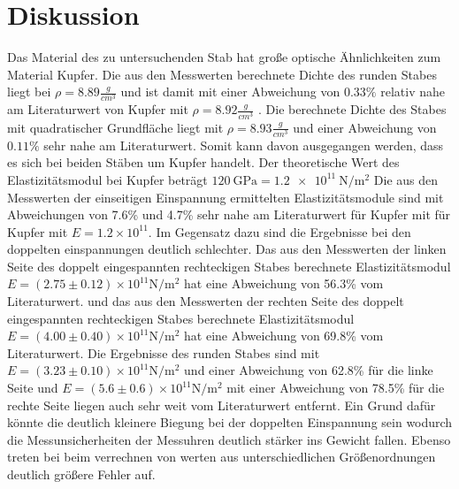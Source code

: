\section{Diskussion}
\label{sec:Diskussion}
Das Material des zu untersuchenden Stab hat große optische Ähnlichkeiten zum Material Kupfer. Die aus den Messwerten berechnete Dichte des runden Stabes liegt bei $\rho=8.89\frac{g}{cm^3}$ und ist damit mit einer Abweichung von $0.33\%$ relativ nahe am Literaturwert von Kupfer mit $\rho=8.92\frac{g}{cm^3}$ \cite{MIT}.
\noindent Die berechnete Dichte des Stabes mit quadratischer Grundfläche liegt mit $\rho=8.93\frac{g}{cm^3}$ und einer Abweichung von $0.11\%$ sehr nahe am Literaturwert. Somit kann davon ausgegangen werden, dass es sich bei beiden Stäben um Kupfer handelt.
\noindent Der theoretische Wert des Elastizitätsmodul bei Kupfer beträgt $\qty{120}{\giga\pascal}=\qty{1.2e11}{\newton\per\meter\squared}$ \cite{MIT}
Die aus den Messwerten der einseitigen Einspannung ermittelten Elastizitätsmodule sind mit Abweichungen von 7.6\% und 4.7\% sehr nahe am Literaturwert für Kupfer mit  für Kupfer mit $E=1.2\times10^{11}$.
\noindent Im Gegensatz dazu sind die Ergebnisse bei den doppelten einspannungen deutlich schlechter.
\noindent Das aus den Messwerten der linken Seite des doppelt eingespannten rechteckigen Stabes berechnete Elastizitätsmodul $E=(2.75 \pm 0.12) \times 10^{11} \unit{\newton\per\meter\squared}$ hat eine Abweichung von 56.3\% vom Literaturwert.
\noindent und das aus den Messwerten der rechten Seite des doppelt eingespannten rechteckigen Stabes berechnete Elastizitätsmodul $E=(4.00 \pm 0.40) \times 10^{11} \unit{\newton\per\meter\squared}$ hat eine Abweichung von 69.8\% vom Literaturwert.
\noindent Die Ergebnisse des runden Stabes sind mit $E=(3.23 \pm 0.10) \times 10^{11} \unit{\newton\per\meter\squared}$ und einer Abweichung von 62.8\% für die linke Seite und $E=(5.6 \pm 0.6) \times 10^{11} \unit{\newton\per\meter\squared}$ mit einer Abweichung von 78.5\% für die rechte Seite liegen auch sehr weit vom Literaturwert entfernt.
\noindent Ein Grund dafür könnte die deutlich kleinere Biegung bei der doppelten Einspannung sein wodurch die Messunsicherheiten der Messuhren deutlich stärker ins Gewicht fallen.
\noindent Ebenso treten bei beim verrechnen von werten aus unterschiedlichen Größenordnungen deutlich größere Fehler auf.